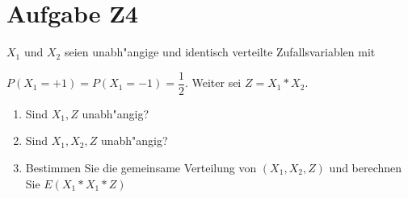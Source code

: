 \section{Aufgabe Z4}

$X_{1}$ und $X_{2}$ seien unabh"angige und identisch verteilte Zufallsvariablen mit

$P(X_{1} = +1) = P(X_{1} = -1) = \dfrac{1}{2}$.
Weiter sei $Z = X_{1} * X_{2}$.

\begin{enumerate}[leftmargin=1cm, label=\alph*)]
	\item Sind $X_{1}, Z$ unabh"angig?
	\vspace{9cm}
	\item Sind $X_{1}, X_{2}, Z$ unabh"angig?
	\vspace{3cm}
	\item Bestimmen Sie die gemeinsame Verteilung von $(X_{1}, X_{2}, Z)$ und berechnen Sie $E(X_{1} * X_{1} * Z)$
\end{enumerate}



